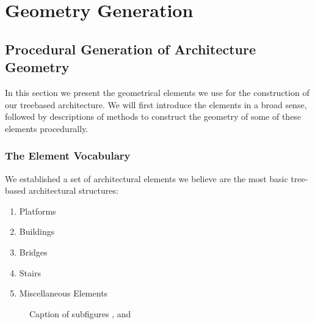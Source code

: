 \chapter{Geometry Generation}

\section{Procedural Generation of Architecture Geometry} 
\label{sec:archelements}
 
In this section we present the geometrical elements we use for the construction of our treebased architecture. We will first introduce the elements in a broad sense, followed by descriptions of methods to construct the geometry of some of these elements procedurally. 
 
\subsection{The Element Vocabulary}
We established a set of architectural elements we believe are the most basic tree-based architectural structures: 

\begin{enumerate}
\item Platforms
\item Buildings
\item Bridges 
\item Stairs
\item Miscellaneous Elements 
\end{enumerate} 

\begin{figure}[ht]
\centering
{}
\label{fig:archElements}
\caption[Architectural Elements Vocabulary]{Caption of subfigures ,  and }
\end{figure}


